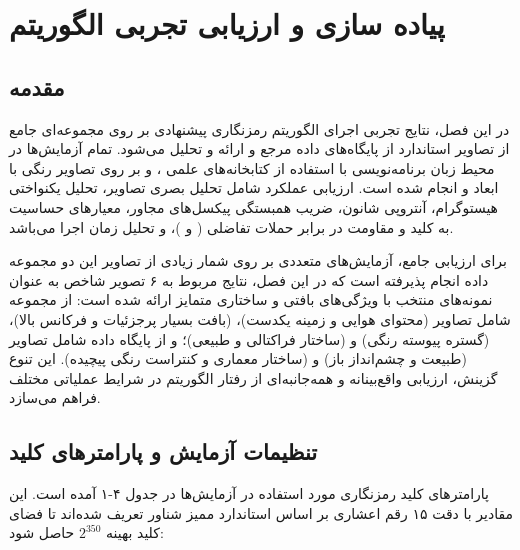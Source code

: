 
\chapter{پیاده سازی و ارزیابی تجربی الگوریتم}
\section{مقدمه}

در این فصل، نتایج تجربی اجرای الگوریتم رمزنگاری پیشنهادی بر روی مجموعه‌ای جامع از تصاویر استاندارد از پایگاه‌های داده مرجع  و  ارائه و تحلیل می‌شود. تمام آزمایش‌ها در محیط زبان برنامه‌نویسی \pyver{} با استفاده از کتابخانه‌های علمی ،  و  بر روی تصاویر رنگی با ابعاد  و  انجام شده است. ارزیابی عملکرد شامل تحلیل بصری تصاویر، تحلیل یکنواختی هیستوگرام، آنتروپی شانون، ضریب همبستگی پیکسل‌های مجاور، معیارهای حساسیت به کلید و مقاومت در برابر حملات تفاضلی ( و )، و تحلیل زمان اجرا می‌باشد.

برای ارزیابی جامع، آزمایش‌های متعددی بر روی شمار زیادی از تصاویر این دو مجموعه داده انجام پذیرفته است که در این فصل، نتایج مربوط به ۶ تصویر شاخص به عنوان نمونه‌های منتخب با ویژگی‌های بافتی و ساختاری متمایز ارائه شده است: از مجموعه  شامل تصاویر  (محتوای هوایی و زمینه یکدست)،  (بافت بسیار پرجزئیات و فرکانس بالا)،  (گستره پیوسته رنگی) و  (ساختار فراکتالی و طبیعی)؛ و از پایگاه داده  شامل تصاویر  (طبیعت و چشم‌انداز باز) و  (ساختار معماری و کنتراست رنگی پیچیده). این تنوع گزینش، ارزیابی واقع‌بینانه و همه‌جانبه‌ای از رفتار الگوریتم در شرایط عملیاتی مختلف فراهم می‌سازد.

\section{تنظیمات آزمایش و پارامترهای کلید}

پارامترهای کلید رمزنگاری مورد استفاده در آزمایش‌ها در جدول ۴-۱ آمده است. این مقادیر با دقت ۱۵ رقم اعشاری بر اساس استاندارد ممیز شناور تعریف شده‌اند تا فضای کلید بهینه $2^{350}$ حاصل شود:

